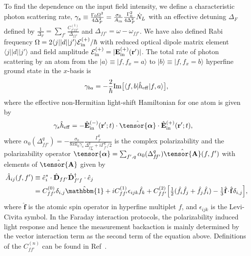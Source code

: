 \documentclass[pra,twocolumn,floatfix,superscriptaddress]{revtex4-1} %
\def\br{\mathbf{r}}
\def\bra#1{\langle{#1}\rvert}%
\def\ket#1{\lvert{#1}\rangle}%
\newcommand{\smallfrac}[2]{\mbox{$\frac{#1}{#2}$}}
\newcommand{\poltens}{\hat{\tensor{\boldsymbol{\alpha}}}}
\newcommand{\charpolq}{\alpha_0(\Delta_{f\!f'}^q)}
\begin{document}
\begin{appendix}
 
To find the dependence on the input field intensity, we define a characteristic photon scattering rate, $\gamma_s \equiv \frac{\Gamma_0\Omega^2}{4\Delta_{F}^2}= \frac{\sigma_0}{A_{\rm in}}\frac{\Gamma_0^2}{4 \Delta_{F}^2} \dot{N}_L $ with an effective detuning $ \Delta_F $ defined by $ \frac{1}{\Delta_F}=\sum_{f'}\frac{C_{f'ff'}^{(1)}}{\Delta_{ff'}} $ and $ \Delta_{ff'}=\omega-\omega_{ff'} $.
We have also defined Rabi frequency $ \Omega=2\bra{j}|d|\ket{j'}\mathcal{E}^{(+)}_{\rm in}/\hbar $ with reduced optical dipole matrix element $\bra{j}|d|\ket{j'}$ and field amplitude $ \mathcal{E}^{(+)}_{\rm in}=|\mathbf{E}_{\rm in}^{(+)}(\br')| $.
The total rate of photon scattering by an atom from the $\ket{a}\equiv \ket{f,f_x=a}$ to $ \ket{b}\equiv\ket{f,f_x=b} $ hyperfine ground state in the $x$-basis is
	\begin{equation}\label{Eq::gammaf}
		\gamma_{ba}=- \frac{2}{\hbar} {\rm Im} \big[ \bra{f,b} \hat{h}_{\rm eff}\ket{f,a} \big] ,
	\end{equation}
where the effective non-Hermitian light-shift Hamiltonian for one atom is given by
\begin{align}
\gamma_s\hat{h}_{\rm eff} &= - \hat{\mathbf{E}}^{(-)}_{\rm in}(\mathbf{r}' ; t ) \cdot \poltens \cdot \hat{\mathbf{E}}^{(+)}_{\rm in}(\mathbf{r}' ;t ),
\end{align}
where $\charpolq = -\frac{\sigma_0}{8\pi k_0\gamma_s}\frac{\Gamma_{f'}^q}{\Delta_{ff'}^q+i\Gamma_{f'}^q/2}$ is the complex polarizability and the polarizability operator $  \poltens=\sum_{f',q}\charpolq\hat{\tensor{\mathbf{A}}}(f,f')$ with elements of $ \hat{\tensor{\mathbf{A}}} $ given by
\begin{align} \label{Eq::PolarizabilityIrrep}
		\hat{A}_{ij}(f,f')&\equiv \hat{e}_i^*\cdot\hat{\mathbf{D}}_{ff'}\hat{\mathbf{D}}_{f'f}^\dagger \cdot \hat{e}_j \\
		&=  C_{ff'}^{(0)} \delta_{i,j}\hat{\mathbbm{1}}+ iC_{ff'}^{(1)}\epsilon_{ijk}\hat{f}_k+ C_{ff'}^{(2)} \Big[ \smallfrac{1}{2} ( \hat{f}_i\hat{f}_j +\hat{f}_j\hat{f}_i )-\smallfrac{1}{3} \hat{\mathbf{f}}\!\cdot\!\hat{\mathbf{f}} \delta_{i,j} \Big], 
\end{align}
where $\hat{\mathbf{f}}$ is the atomic spin operator in hyperfine multiplet $f$, and $ \epsilon_{ijk} $ is the Levi-Civita symbol. 
In the Faraday interaction protocols, the polarizability induced light response and hence the measurement backaction is mainly determined by the vector interaction term as the second term of the equation above.
Definitions of the $ C_{ff'}^{(n)} $ can be found in Ref~\cite{Qi2016}.


\end{appendix}
\end{document}
